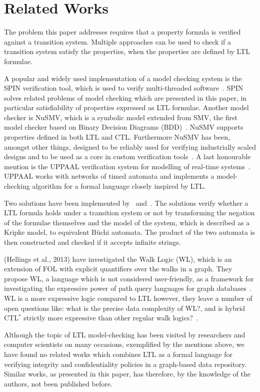 \section{Related Works}
The problem this paper addresses requires that a property formula is verified against a transition system. Multiple approaches can be used to check if a transition system satisfy the properties, when the properties are defined by LTL formulae.

A popular and widely used implementation of a model checking system is the SPIN verification tool, which is used to verify multi-threaded software~\cite{spin}. SPIN solves related problems of model checking which are presented in this paper, in particular satisfiability of properties expressed as LTL formulae.
Another model checker is NuSMV, which is a symbolic model extended from SMV, the first model checker based on Binary Decision Diagrams (BDD)~\cite{nusmv}. NuSMV supports properties defined in both LTL and CTL. Furthermore NuSMV has been, amongst other things, designed to be reliably used for verifying industrially scaled designs and to be used as a core in custom verification tools~\cite{nusmv}.
A last honourable mention is the UPPAAL verification system for modelling of real-time systems~\cite{uppaal}. UPPAAL works with networks of timed automata and implements a model-checking algorithm for a formal language closely inspired by LTL.

Two solutions have been implemented by~\cite{jpsember} and~\cite{serejke}. The solutions verify whether a LTL formula holds under a transition system or not by transforming the negation of the formulae themselves and the model of the system, which is described as a Kripke model, to equivalent Büchi automata. The product of the two automata is then constructed and checked if it accepts infinite strings.

(Hellings et al., 2013)\cite{hellings2013walk} have investigated the Walk Logic (WL), which is an extension of FOL with explicit quantifiers over the walks in a graph. They propose WL, a language which is not considered user-friendly, as a framework for investigating the expressive power of path query languages for graph databases~\cite{hellings2013walk}. WL is a more expressive logic compared to LTL however, they leave a number of open questions like: what is the precise data complexity of WL?, and is hybrid CTL$^\ast$ strictly more expressive than other regular walk logics?~\cite{hellings2013walk}.

Although the topic of LTL model-checking has been visited by researchers and computer scientists on many occasions, exemplified by the mentions above, we have found no related works which combines LTL as a formal language for verifying integrity and confidentiality policies in a graph-based data repository. Similar works, as presented in this paper, has therefore, by the knowledge of the authors, not been published before.


